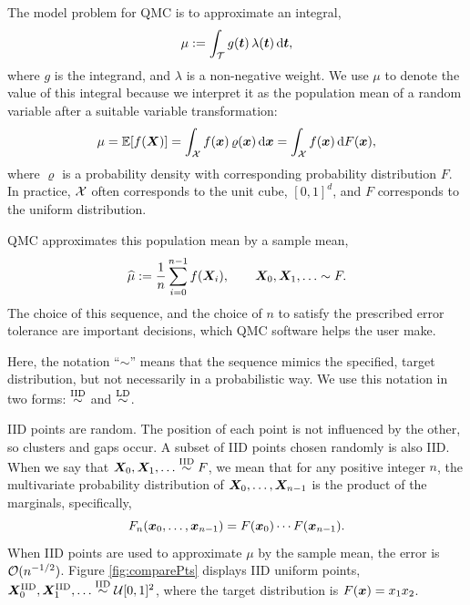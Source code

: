 \documentclass[graybox,footinfo]{svmult}
\newcommand{\hmu}{\widehat{\mu}}
\newcommand{\IID}{\textup{IID}}
\newcommand{\LD}{\textup{LD}}
\newcommand{\IIDsim}{\overset{\IID}{\sim}}
\newcommand{\LDsim}{\overset{\LD}{\sim}}
\begin{document}
The model problem for QMC is to approximate an integral,
\begin{equation} \label{eq:integral}
	\mu := \int_\calT g(\bst) \, \lambda(\bst) \, \D \bst,
\end{equation}
where $g$ is the integrand, and $\lambda$ is a non-negative weight.  We use $\mu$ to denote the value of this integral because we interpret it as the population mean of a random variable after a suitable variable transformation:
\begin{equation} \label{eq:fintegral}
	\mu = \bbE[f(\bsX)] = \int_\calX f(\bsx) \, \varrho(\bsx) \, \D \bsx =  \int_\calX f(\bsx) \,  \D F(\bsx) ,
\end{equation}
where $\varrho$ is a probability density with corresponding probability distribution $F$.  In practice, ${\mathcal{X}}$ often corresponds to the unit cube, $[0,1]^d$, and $F$ corresponds to the uniform distribution.  

QMC approximates this population mean by a sample mean,
\begin{equation} \label{eq:samplemean}
	\hmu := \frac 1n \sum_{i=0}^{n-1} f(\bsX_i), \qquad \bsX_0, \bsX_1, \ldots \sim F.
\end{equation}
The choice of this sequence, and the choice of $n$ to satisfy  the prescribed error tolerance are important decisions, which  QMC software helps the user make.

Here, the notation ``$\sim$'' means that the sequence mimics the specified, target distribution, but not necessarily in a probabilistic way.  We  use this notation in two forms:  $\IIDsim$ and $\LDsim$.

IID points are random. The position of each point is not influenced by the other, so clusters and gaps occur.  A subset of IID points chosen randomly is also IID.  When we say that $\bsX_0, \bsX_1, \ldots \IIDsim F$, we mean that for any positive integer $n$, the  multivariate probability distribution of ${\boldsymbol{X}}_0, \ldots, {\boldsymbol{X}}_{n-1}$ is the product of the marginals, specifically,
\begin{equation*}
	F_{n}({\boldsymbol{x}}_0, \ldots, {\boldsymbol{x}}_{n-1}) = F({\boldsymbol{x}}_0) \cdots  F({\boldsymbol{x}}_{n-1}).
\end{equation*}
When IID points are used to approximate $\mu$ by the sample mean, the error is ${\mathcal{O}}(n^{-1/2})$.  Figure \ref{fig:comparePts} displays IID uniform points, $\bsX^{\IID}_0, \bsX^{\IID}_1, \ldots \IIDsim \calU[0,1]^2$, where the target distribution is $F({\boldsymbol{x}}) = x_1 x_2$.
\end{document}
